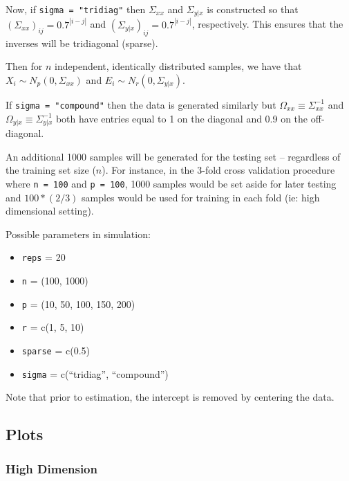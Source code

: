 \documentclass[11pt,]{report}
\providecommand{\tightlist}{%
  \setlength{\itemsep}{0pt}\setlength{\parskip}{0pt}}
\begin{document}
Now, if \texttt{sigma\ =\ "tridiag"} then \(\Sigma_{xx}\) and \(\Sigma_{y | x}\) is constructed so that \(\left( \Sigma_{xx} \right)_{ij} = 0.7^{\left| i - j \right|}\) and \(\left( \Sigma_{y | x} \right)_{ij} = 0.7^{\left| i - j \right|}\), respectively. This ensures that the inverses will be tridiagonal (sparse).

Then for \(n\) independent, identically distributed samples, we have that \(X_{i} \sim N_{p}\left( 0, \Sigma_{xx} \right)\) and \(E_{i} \sim N_{r}\left( 0, \Sigma_{y | x} \right)\).

If \texttt{sigma\ =\ "compound"} then the data is generated similarly but \(\Omega_{xx} \equiv \Sigma_{xx}^{-1}\) and \(\Omega_{y | x} \equiv \Sigma_{y | x}^{-1}\) both have entries equal to 1 on the diagonal and 0.9 on the off-diagonal.

An additional 1000 samples will be generated for the testing set -- regardless of the training set size (\(n\)). For instance, in the 3-fold cross validation procedure where \texttt{n\ =\ 100} and \texttt{p\ =\ 100}, 1000 samples would be set aside for later testing and \(100*(2/3)\) samples would be used for training in each fold (ie: high dimensional setting).

Possible parameters in simulation:

\begin{itemize}
\tightlist
\item
  \texttt{reps} = 20
\item
  \texttt{n} = (100, 1000)
\item
  \texttt{p} = (10, 50, 100, 150, 200)
\item
  \texttt{r} = c(1, 5, 10)
\item
  \texttt{sparse} = c(0.5)
\item
  \texttt{sigma} = c(``tridiag'', ``compound'')
\end{itemize}

Note that prior to estimation, the intercept is removed by centering the data.

\hypertarget{plots-2}{%
\subsection{Plots}\label{plots-2}}

\hypertarget{high-dimension-1}{%
\subsubsection{High Dimension}\label{high-dimension-1}}
\end{document}
